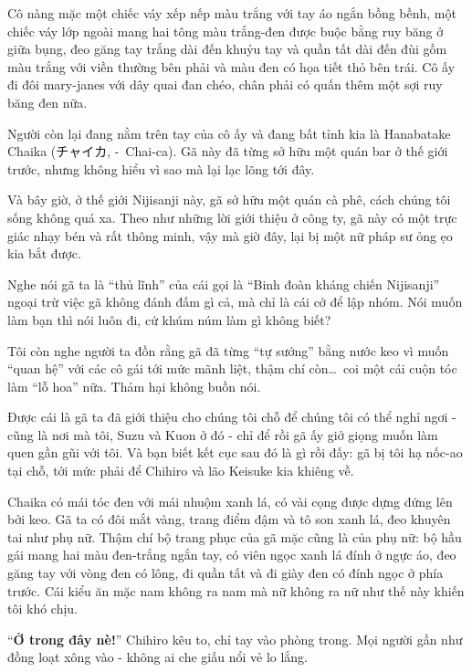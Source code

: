 \documentclass[../main.tex]{subfiles}
\begin{document}

Cô nàng mặc một chiếc váy xếp nếp màu trắng với tay áo ngắn bồng bềnh, một chiếc váy lớp ngoài mang hai tông màu trắng-đen được buộc bằng ruy băng ở giữa bụng, đeo găng tay trắng dài đến khuỷu tay và quần tất dài đến đùi gồm màu trắng với viền thường bên phải và màu đen có họa tiết thỏ bên trái. Cô ấy đi đôi mary-janes với dây quai đan chéo, chân phải có quấn thêm một sợi ruy băng đen nữa.

Người còn lại đang nằm trên tay của cô ấy và đang bất tỉnh kia là Hanabatake Chaika (チャイカ, -\ Chai-ca). Gã này đã từng sở hữu một quán bar ở thế giới trước, nhưng không hiểu vì sao mà lại lạc lõng tới đây.

Và bây giờ, ở thế giới Nijisanji này, gã sở hữu một quán cà phê, cách chúng tôi sống không quá xa. Theo như những lời giới thiệu ở công ty, gã này có một trực giác nhạy bén và rất thông minh, vậy mà giờ đây, lại bị một nữ pháp sư ỏng ẹo kia bắt được.

Nghe nói gã ta là ``thủ lĩnh'' của cái gọi là ``Binh đoàn kháng chiến Nijisanji'' ngoại trừ việc gã không đánh đấm gì cả, mà chỉ là cái cớ để lập nhóm. Nói muốn làm bạn thì nói luôn đi, cứ khúm núm làm gì không biết?

Tôi còn nghe người ta đồn rằng gã đã từng ``tự sướng'' bằng nước keo vì muốn ``quan hệ'' với các cô gái tới mức mãnh liệt, thậm chí còn\dots\ coi một cái cuộn tóc làm ``lỗ hoa'' nữa. Thảm hại không buồn nói.

Được cái là gã ta đã giới thiệu cho chúng tôi chỗ để chúng tôi có thể nghỉ ngơi - cũng là nơi mà tôi, Suzu và Kuon ở đó - chỉ để rồi gã ấy giở giọng muốn làm quen gần gũi với tôi. Và bạn biết kết cục sau đó là gì rồi đấy: gã bị tôi hạ nốc-ao tại chỗ, tới mức phải để Chihiro và lão Keisuke kia khiêng về.

Chaika có mái tóc đen với mái nhuộm xanh lá, có vài cọng được dựng đứng lên bởi keo. Gã ta có đôi mắt vàng, trang điểm đậm và tô son xanh lá, đeo khuyên tai như phụ nữ. Thậm chí bộ trang phục của gã mặc cũng là của phụ nữ: bộ hầu gái mang hai màu đen-trắng ngắn tay, có viên ngọc xanh lá đính ở ngực áo, đeo găng tay với vòng đen có lông, đi quần tất và đi giày đen có đính ngọc ở phía trước. Cái kiểu ăn mặc nam không ra nam mà nữ không ra nữ như thế này khiến tôi khó chịu.

\chrint


``\textbf{Ở trong đây nè!}'' Chihiro kêu to, chỉ tay vào phòng trong. Mọi người gần như đồng loạt xông vào - không ai che giấu nổi vẻ lo lắng.
\end{document}
